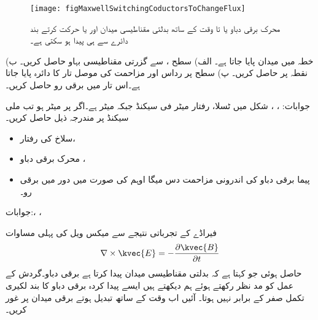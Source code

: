 \begin{figure}
\centering
\texttt{[image: figMaxwellSwitchingCoductorsToChangeFlux]}
\caption{محرک برقی دباو یا تا وقت کے ساتھ بدلتی مقناطیسی میدان اور یا حرکت کرتے بند دائرے سے ہی پیدا ہو سکتی ہے۔}
\label{شکل-میکس_ویل_سوئچ_سے_محرک_دباو_نہیں_پیدا_ہوتی}
\end{figure}

خطہ  میں میدان  پایا جاتا ہے۔ الف) سطح ،  سے گزرتی مقناطیسی بہاو حاصل کریں۔ ب) نقطہ  پر  حاصل کریں۔ پ) سطح  پر رداس  اور مزاحمت  کی موصل تار کا دائرہ پایا جاتا ہے۔اس تار میں برقی رو حاصل کریں۔

جوابات: ، ، 
شکل  میں  ٹسلا، رفتار  میٹر فی سیکنڈ جبکہ  میٹر ہے۔اگر  پر  میٹر ہو تب  ملی سیکنڈ پر مندرجہ ذیل حاصل کریں۔
\begin{itemize}
\item
سلاخ کی رفتار،
\item
محرک برقی دباو ،
\item
پیما برقی دباو کی اندرونی مزاحمت دس میگا اوہم کی صورت میں دور میں برقی رو۔
\end{itemize} 

جوابات:، ، 


فیراڈے کے تجرباتی نتیجے سے میکس ویل کی پہلی مساوات
\begin{align}\label{مساوات_میکس_ویل_انتقالی_رو_الف}
\nabla \times \kvec{E}=-\frac{\partial \kvec{B}}{\partial t}
\end{align}
حاصل ہوئی جو کہتا ہے کہ بدلتی مقناطیسی میدان پیدا کرتا ہے برقی دباو۔گردش کے عمل کو مد نظر رکھتے ہوئے ہم دیکھتے ہیں ایسے پیدا کردہ برقی دباو کا بند لکیری تکمل صفر کے برابر نہیں ہوتا۔ آئیں اب وقت کے ساتھ تبدیل ہوتے برقی میدان پر غور کریں۔

